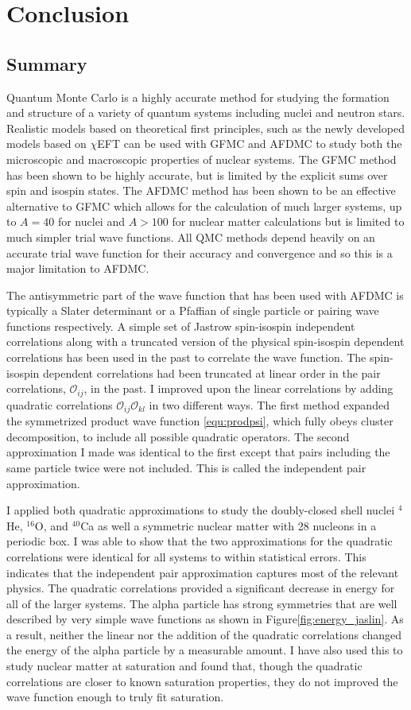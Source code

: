\section{Conclusion}
\subsection{Summary}
Quantum Monte Carlo is a highly accurate method for studying the formation and structure of a variety of quantum systems including nuclei and neutron stars. Realistic models based on theoretical first principles, such as the newly developed models based on $\chi$EFT can be used with GFMC and AFDMC to study both the microscopic and macroscopic properties of nuclear systems. The GFMC method has been shown to be highly accurate, but is limited by the explicit sums over spin and isospin states. The AFDMC method has been shown to be an effective alternative to GFMC which allows for the calculation of much larger systems, up to $A=40$ for nuclei and $A>100$ for nuclear matter calculations but is limited to much simpler trial wave functions. All QMC methods depend heavily on an accurate trial wave function for their accuracy and convergence and so this is a major limitation to AFDMC.

The antisymmetric part of the wave function that has been used with AFDMC is typically a Slater determinant or a Pfaffian of single particle or pairing wave functions respectively. A simple set of Jastrow spin-isospin independent correlations along with a truncated version of the physical spin-isospin dependent correlations has been used in the past to correlate the wave function. The spin-isospin dependent correlations had been truncated at linear order in the pair correlations, $\mathcal{O}_{ij}$, in the past. I improved upon the linear correlations by adding quadratic correlations $\mathcal{O}_{ij}\mathcal{O}_{kl}$ in two different ways. The first method expanded the symmetrized product wave function \ref{equ:prodpsi}, which fully obeys cluster decomposition, to include all possible quadratic operators. The second approximation I made was identical to the first except that pairs including the same particle twice were not included. This is called the independent pair approximation.

I applied both quadratic approximations to study the doubly-closed shell nuclei $^4$He, $^{16}$O, and $^{40}$Ca as well a symmetric nuclear matter with 28 nucleons in a periodic box. I was able to show that the two approximations for the quadratic correlations were identical for all systems to within statistical errors. This indicates that the independent pair approximation captures most of the relevant physics. The quadratic correlations provided a significant decrease in energy for all of the larger systems. The alpha particle has strong symmetries that are well described by very simple wave functions as shown in Figure\ref{fig:energy_jaslin}. As a result, neither the linear nor the addition of the quadratic correlations changed the energy of the alpha particle by a measurable amount. I have also used this to study nuclear matter at saturation and found that, though the quadratic correlations are closer to known saturation properties, they do not improved the wave function enough to truly fit saturation.

